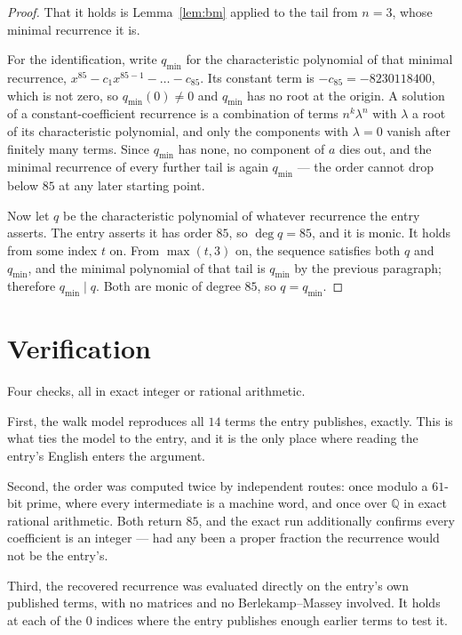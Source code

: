 \documentclass[11pt,a4paper]{article}
\theoremstyle{plain}
\theoremstyle{definition}
\begin{document}
\begin{proof}
That it holds is Lemma~\ref{lem:bm} applied to the tail from $n=3$, whose minimal
recurrence it is.

For the identification, write $q_{\min}$ for the characteristic polynomial of that minimal
recurrence, $x^{85}-c_1x^{85-1}-\dots-c_{85}$. Its constant term is
$-c_{85}=-8230118400$, which is not zero, so $q_{\min}(0)\neq0$ and $q_{\min}$ has no
root at the origin. A solution of a constant-coefficient recurrence is a combination of terms
$n^{k}\lambda^{n}$ with $\lambda$ a root of its characteristic polynomial, and only the
components with $\lambda=0$ vanish after finitely many terms. Since $q_{\min}$ has none, no
component of $a$ dies out, and the minimal recurrence of every further tail is again
$q_{\min}$ --- the order cannot drop below $85$ at any later starting point.

Now let $q$ be the characteristic polynomial of whatever recurrence the entry asserts. The
entry asserts it has order $85$, so $\deg q=85$, and it is monic. It holds from some
index $t$ on. From $\max(t,3)$ on, the sequence satisfies both $q$ and $q_{\min}$, and
the minimal polynomial of that tail is $q_{\min}$ by the previous paragraph; therefore
$q_{\min}\mid q$. Both are monic of degree $85$, so $q=q_{\min}$.
\end{proof}

\section{Verification}

Four checks, all in exact integer or rational arithmetic.

First, the walk model reproduces all $14$ terms the entry publishes, exactly. This is
what ties the model to the entry, and it is the only place where reading the entry's English
enters the argument.

Second, the order was computed twice by independent routes: once modulo a $61$-bit prime, where
every intermediate is a machine word, and once over $\mathbb{Q}$ in exact rational arithmetic.
Both return $85$, and the exact run additionally confirms every coefficient is an integer
--- had any been a proper fraction the recurrence would not be the entry's.

Third, the recovered recurrence was evaluated directly on the entry's own published terms, with
no matrices and no Berlekamp--Massey involved. It holds at each of the $0$ indices where
the entry publishes enough earlier terms to test it.
\end{document}
